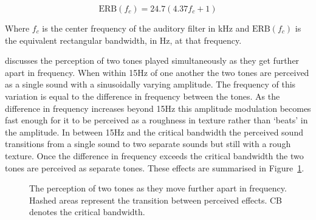 		\begin{equation}
			\mathrm{ERB}(f_{c}) = 24.7(4.37f_{c} + 1)
			\label{eq:ERB}
		\end{equation}

		Where $f_{c}$ is the center frequency of the auditory filter in kHz and $\mathrm{ERB}(f_{c})$ is the
		equivalent rectangular bandwidth, in Hz, at that frequency.

		\citet{howard2009acoustics} discusses the perception of two tones played simultaneously as they get further
		apart in frequency. When within 15Hz of one another the two tones are perceived as a single sound with a
		sinusoidally varying amplitude. The frequency of this variation is equal to the difference in frequency
		between the tones. As the difference in frequency increases beyond 15Hz this amplitude modulation becomes
		fast enough for it to be perceived as a roughness in texture rather than `beats' in the amplitude. In
		between 15Hz and the critical bandwidth the perceived sound transitions from a single sound to two separate
		sounds but still with a rough texture. Once the difference in frequency exceeds the critical bandwidth the
		two tones are perceived as separate tones. These effects are summarised in Figure~\ref{fig:ToneSeparation}.

		\begin{figure}[h!]
			\centering
			\caption{The perception of two tones as they move further apart in frequency. Hashed areas
				 represent the transition between perceived effects. CB denotes the critical bandwidth.}
			\label{fig:ToneSeparation}
		\end{figure}

